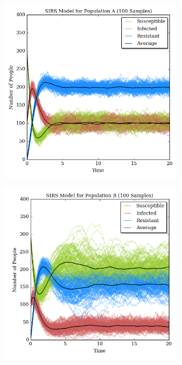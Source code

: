 \documentclass[prb,aps,twocolumn,showpacs,10pt]{revtex4-1}
\begin{document}
\begin{figure}
\centering
\begin{subfigure}{.5\textwidth}
  \centering
  \includegraphics[width=\linewidth]{trials_A100.png}
  \label{fig:sub1}
\end{subfigure}%
\begin{subfigure}{.5\textwidth}
  \centering
  \includegraphics[width=\linewidth]{trials_B100.png}
  \label{fig:sub2}
\end{subfigure}
\label{fig:test}


\end{figure}
\end{document}

